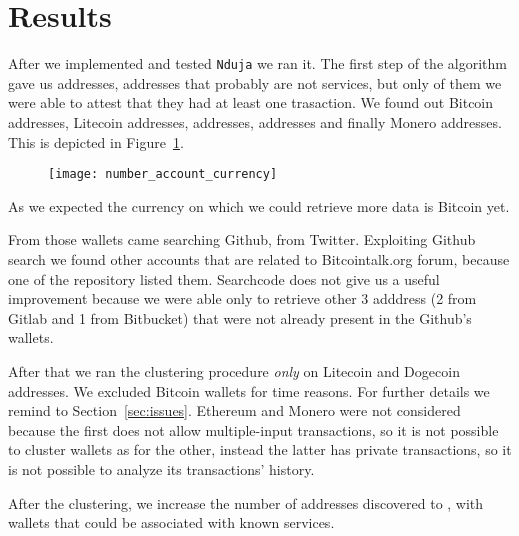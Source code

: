 \newcommand{\accountGitlab}{2}

\newcommand{\accountBitbucket}{1}





\section{Results} \label{results}
After we implemented and tested \texttt{Nduja} we ran it. The first step of the
algorithm gave us \startingNumberAllWallets{} addresses,
\startingNumberWalletsNotService{} addresses that probably are not services,
but only \startingNumberWalletsAtLeastOneTransaction{} of them we were able to
attest that they had at least one trasaction. We found out \startingBTC{}
Bitcoin addresses, \startingLTC{} Litecoin addresses, \startingDOGE{}
addresses, \startingETH{} addresses and finally \startingXMR{} Monero
addresses. This is depicted in Figure~\ref{fig:numberaccountcurrency}.
\begin{figure}
\centering
\texttt{[image: number\_account\_currency]}
\label{fig:numberaccountcurrency}
\end{figure}

As we expected the currency on which we could retrieve more data is Bitcoin
yet. 

From those wallets \accountGithub{} came searching Github, \accountTwitter{}
from Twitter. Exploiting Github search we found other \accountBitcointalk{}
accounts that are related to Bitcointalk.org forum, because one of the
repository listed them. Searchcode does not give us a useful improvement
because we were able only to retrieve other 3 adddress (\accountGitlab{} from
Gitlab and \accountBitbucket{} from Bitbucket) that were not already present in
the Github's wallets. 

After that we ran the clustering procedure \emph{only} on Litecoin and Dogecoin
addresses. We excluded Bitcoin wallets for time reasons. For further details we
remind to Section~\ref{sec:issues}. Ethereum and Monero were not considered
because the first does not allow multiple-input transactions, so it is not
possible to cluster wallets as for the other, instead the latter has private
transactions, so it is not possible to analyze its transactions' history. 

After the clustering, we increase the number of addresses discovered to
\clusteringNumberAllWallets{}, with \clusteringNumberWalletsNotService{}
wallets that could be associated with known services.

